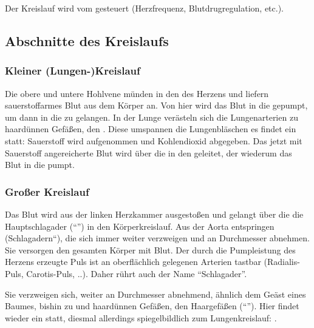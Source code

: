 Der Kreislauf wird vom  gesteuert
(Herzfrequenz, Blutdrugregulation, etc.).

\subsection{Abschnitte des Kreislaufs}
\vspace{-2em}

\begin{gWideParEnv}
\gMarried
{\subsubsection{Kleiner (Lungen-)Kreislauf}
Die obere und untere Hohlvene münden in den  des Herzens und liefern sauerstoffarmes Blut aus
dem Körper an. Von hier wird das Blut in die  gepumpt, um dann in die  zu
gelangen. In der Lunge verästeln sich die Lungenarterien
zu haardünnen Gefäßen, den . Diese
umspannen die Lungenbläschen es findet ein
 statt: Sauerstoff wird aufgenommen und
Kohlendioxid abgegeben. Das jetzt mit Sauerstoff
angereicherte Blut wird über die  in den
 geleitet, der wiederum das Blut in die
 pumpt.

\vspace{1em}

\subsubsection{Großer Kreislauf}
Das Blut wird aus der linken Herzkammer ausgestoßen und
gelangt über die die Hauptschlagader
("`"') in den
Körperkreislauf. Aus der Aorta entspringen 
({\quotedblbase}Schlagadern{\textquotedblleft}), die sich
immer weiter verzweigen und an Durchmesser abnehmen. Sie
versorgen den gesamten Körper mit Blut. Der durch die
Pumpleistung des Herzens erzeugte Puls ist an oberflächlich
gelegenen Arterien tastbar (Radialis-Puls, Carotis-Puls, ..).
Daher rührt auch der Name
"`Schlagader"'.

Sie verzweigen sich, weiter an Durchmesser abnehmend,
ähnlich dem Geäst eines Baumes, bishin zu
 und haardünnen Gefäßen, den
Haargefäßen ("`"').
Hier findet wieder ein  statt, diesmal
allerdings spiegelbildlich zum Lungenkreislauf:
.

}
\end{gWideParEnv}
